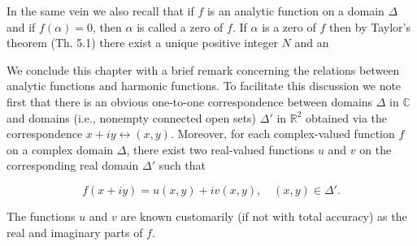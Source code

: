 In the same vein we also recall that if $f$ is an analytic function on a domain $\Delta$ and if $f(\alpha) = 0$, then $\alpha$ is called a zero of $f$. If $\alpha$ is a zero of $f$ then by Taylor's theorem (Th. 5.1) there exist a unique positive integer $N$ and an

We conclude this chapter with a brief remark concerning the relations between analytic functions and harmonic functions. To facilitate this discussion we note first that there is an obvious one-to-one correspondence between domains $\Delta$ in $\mathbb{C}$ and domains (i.e., nonempty connected open sets) $\Delta'$ in $\mathbb{R}^2$ obtained via the correspondence $x + iy \leftrightarrow (x, y)$. Moreover, for each complex-valued function $f$ on a complex domain $\Delta$, there exist two real-valued functions $u$ and $v$ on the corresponding real domain $\Delta'$ such that

$$f(x + iy) = u(x, y) + iv(x, y), \quad (x, y) \in \Delta'.$$

The functions $u$ and $v$ are known customarily (if not with total accuracy) as the real and imaginary parts of $f$.
